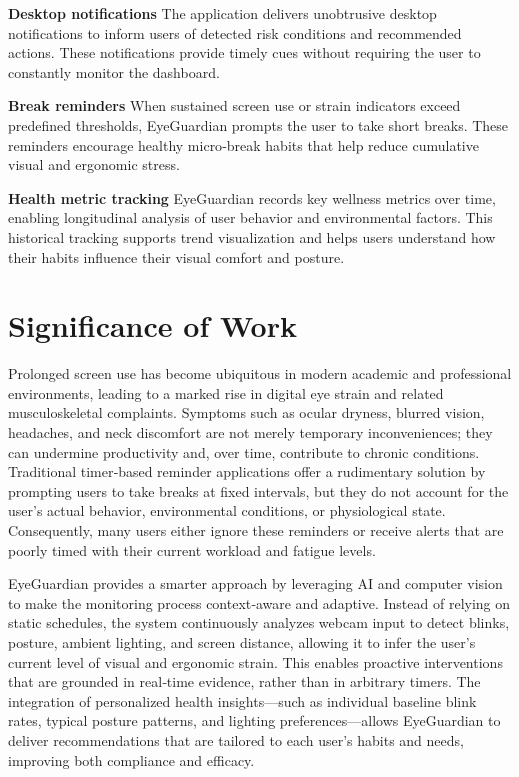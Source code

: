 \documentclass[12pt]{report}
\begin{document}
\textbf{Desktop notifications}
The application delivers unobtrusive desktop notifications to inform users of detected risk conditions and recommended actions. These notifications provide timely cues without requiring the user to constantly monitor the dashboard.

\textbf{Break reminders}
When sustained screen use or strain indicators exceed predefined thresholds, EyeGuardian prompts the user to take short breaks. These reminders encourage healthy micro‑break habits that help reduce cumulative visual and ergonomic stress.

\textbf{Health metric tracking}
EyeGuardian records key wellness metrics over time, enabling longitudinal analysis of user behavior and environmental factors. This historical tracking supports trend visualization and helps users understand how their habits influence their visual comfort and posture.

\section{Significance of Work}

Prolonged screen use has become ubiquitous in modern academic and professional environments, leading to a marked rise in digital eye strain and related musculoskeletal complaints. Symptoms such as ocular dryness, blurred vision, headaches, and neck discomfort are not merely temporary inconveniences; they can undermine productivity and, over time, contribute to chronic conditions. Traditional timer‑based reminder applications offer a rudimentary solution by prompting users to take breaks at fixed intervals, but they do not account for the user’s actual behavior, environmental conditions, or physiological state. Consequently, many users either ignore these reminders or receive alerts that are poorly timed with their current workload and fatigue levels.

EyeGuardian provides a smarter approach by leveraging AI and computer vision to make the monitoring process context‑aware and adaptive. Instead of relying on static schedules, the system continuously analyzes webcam input to detect blinks, posture, ambient lighting, and screen distance, allowing it to infer the user’s current level of visual and ergonomic strain. This enables proactive interventions that are grounded in real‑time evidence, rather than in arbitrary timers. The integration of personalized health insights—such as individual baseline blink rates, typical posture patterns, and lighting preferences—allows EyeGuardian to deliver recommendations that are tailored to each user’s habits and needs, improving both compliance and efficacy.
\end{document}
